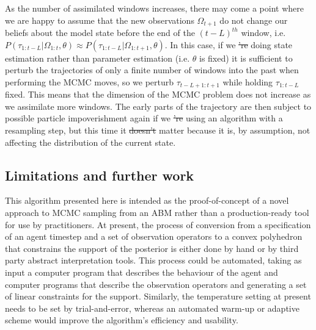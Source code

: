 \documentclass{article}
\providecommand{\DIFaddtex}[1]{{\protect\color{blue}\uwave{#1}}} %
\providecommand{\DIFdeltex}[1]{{\protect\color{red}\sout{#1}}}                      %
\providecommand{\DIFaddbegin}{} %
\providecommand{\DIFaddend}{} %
\providecommand{\DIFdelbegin}{} %
\providecommand{\DIFdelend}{} %
\providecommand{\DIFadd}[1]{\texorpdfstring{\DIFaddtex{#1}}{#1}} %
\providecommand{\DIFdel}[1]{\texorpdfstring{\DIFdeltex{#1}}{}} %
\newcommand{\DIFscaledelfig}{0.5}
\newlength{\DIFdelgraphicswidth} %
\newlength{\DIFdelgraphicsheight} %
\newcommand{\DIFaddincludegraphics}[2][]{{\color{blue}\fbox{\DIFOincludegraphics[#1]{#2}}}} %
\newcommand{\DIFdelincludegraphics}[2][]{%
\sbox{\DIFdelgraphicsbox}{\DIFOincludegraphics[#1]{#2}}%
\settoboxwidth{\DIFdelgraphicswidth}{\DIFdelgraphicsbox} %
\settoboxtotalheight{\DIFdelgraphicsheight}{\DIFdelgraphicsbox} %
\scalebox{\DIFscaledelfig}{%
\parbox[b]{\DIFdelgraphicswidth}{\usebox{\DIFdelgraphicsbox}\\[-\baselineskip] \rule{\DIFdelgraphicswidth}{0em}}\llap{\resizebox{\DIFdelgraphicswidth}{\DIFdelgraphicsheight}{%
\setlength{\unitlength}{\DIFdelgraphicswidth}%
\begin{picture}(1,1)%
\thicklines\linethickness{2pt} %
{\color[rgb]{1,0,0}\put(0,0){\framebox(1,1){}}}%
{\color[rgb]{1,0,0}\put(0,0){\line( 1,1){1}}}%
{\color[rgb]{1,0,0}\put(0,1){\line(1,-1){1}}}%
\end{picture}%
}\hspace*{3pt}}} %
} %
\DeclareRobustCommand{\DIFaddbegin}{\DIFOaddbegin \let\includegraphics\DIFaddincludegraphics} %
\DeclareRobustCommand{\DIFaddend}{\DIFOaddend \let\includegraphics\DIFOincludegraphics} %
\DeclareRobustCommand{\DIFdelbegin}{\DIFOdelbegin \let\includegraphics\DIFdelincludegraphics} %
\DeclareRobustCommand{\DIFdelend}{\DIFOaddend \let\includegraphics\DIFOincludegraphics} %
\begin{document}
As the number of assimilated windows increases, there may come a point where we are happy to assume that the new observations $\Omega_{t+1}$ do not change our beliefs about the model state before the end of the $(t-L)^{th}$ window, i.e. $P(\tau_{1:t-L}|\Omega_{1:t},\theta) \approx P(\tau_{1:t-L}|\Omega_{1:t+1},\theta)$. In this case, if we \DIFdelbegin \DIFdel{'re }\DIFdelend \DIFaddbegin \DIFadd{are }\DIFaddend doing state estimation rather than parameter estimation (i.e. $\theta$ is fixed) it is sufficient to perturb the trajectories of only a finite number of windows into the past when performing the MCMC moves, so we perturb $\tau_{t-L+1:t+1}$ while holding $\tau_{1:t-L}$ fixed. This means that the dimension of the MCMC problem does not increase as we assimilate more windows. The early parts of the trajectory are then subject to possible particle impoverishment again if we \DIFdelbegin \DIFdel{'re }\DIFdelend \DIFaddbegin \DIFadd{were }\DIFaddend using an algorithm with a resampling step, but this time it \DIFdelbegin \DIFdel{doesn't }\DIFdelend \DIFaddbegin \DIFadd{does not }\DIFaddend matter because it is, by assumption, not affecting the distribution of the current state.

\subsection{Limitations and further work}

This algorithm presented here is intended as the proof-of-concept of a novel approach to MCMC sampling from an ABM rather than a production-ready tool for use by practitioners. At present, the process of conversion from a specification of an agent timestep and a set of observation operators to a convex polyhedron that constrains the support of the posterior is either done by hand or by third party abstract interpretation tools. This process could be automated, taking as input a computer program that describes the behaviour of the agent and computer programs that describe the observation operators and generating a set of linear constraints for the support. Similarly, the temperature setting at present needs to be set by trial-and-error, whereas an automated warm-up or adaptive scheme would improve the algorithm's efficiency and usability.
\end{document}
